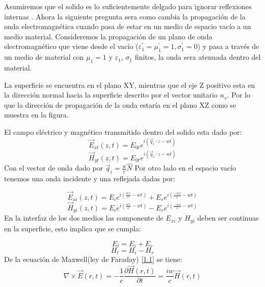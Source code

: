 \documentclass[a4paper,openright,12pt]{book}
\begin{document}
Asumiremos que el solido es lo suficientemente delgado  para ignorar reflexiones internas \cite{SolidStatePhysics}. Ahora la siguiente pregunta sera como cambia la propagación de la onda electromagnética cuando pasa de estar en un medio de espacio vacío a un medio material. Consideremos la propagación de un plano de onda electromagnético que viene desde el vacío ($\varepsilon^{'}_{1}=\mu_{1}^{'}=1,\sigma_{1}^{'}=0$) y pasa a través de un medio de material con $\mu_{1}=1$ y $\varepsilon_{1}$, $\sigma_{1}$ finitos, la onda sera atenuada dentro del material.

La superficie se encuentra en el plano XY, mientras que  el eje Z  positivo esta en la dirección normal hacia la superficie descrito por el vector unitario $n_{s}$. Por lo que la dirección de propagación de la onda estaría en el plano XZ como se muestra en la figura.

El campo eléctrico y magnético transmitido dentro del solido esta dado por:
\begin{equation}\label{Ei1}
\vec{E}_{xt}(z,t)=E_{0t}e^{i(\vec{q}_{i}\cdot z -wt)}
\end{equation}
\begin{equation}\label{Ei2}
\vec{H}_{yt}(z,t)=E_{0t}e^{i(\vec{q}_{i}\cdot z -wt)}
\end{equation}
Con el vector de onda dado por $\vec{q}_{i}=\frac{w}{c}\hat{N}$
Por otro lado en el espacio vacío tenemos una onda incidente y una reflejada dadas por:

\begin{equation}\label{Et1}
\vec{E}_{xi}(z,t)=E_{i}e^{i(\frac{wz}{c}-wt)}+E_{r}e^{i(\frac{-wz}{c}-wt)}
\end{equation}
\begin{equation}\label{Et2}
\vec{H}_{yi}(z,t)=E_{i}e^{i(\frac{wz}{c}-wt)}-E_{r}e^{i(\frac{-wz}{c}-wt)}
\end{equation}
En la interfaz de los dos medios las componente de $E_{xi}$ y $H_{yi}$ deben ser continuas en la superficie, esto implica que se cumpla:

\begin{equation}\label{Ecuacioncondicion}
E_{t}=E_{i}+E_{r}
\end{equation}
\begin{equation}
H_{t}=H_{i}-H_{r}
\end{equation}
De la ecuación de Maxwell(ley de Faraday) \ref{1.1} se tiene:
\begin{equation}
\nabla\times \vec{E}(r,t)=-\frac{1}{c}\frac{\partial\vec{H}(r,t)}{\partial t}=\frac{iw}{c}\vec{H}(r,t)
\end{equation}
\end{document}
